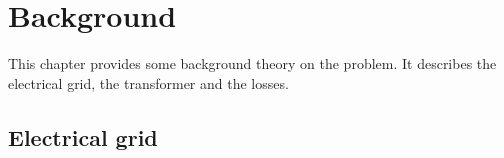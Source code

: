 \chapter{Background} \label{sec:background}

This chapter provides some background theory on the problem. It describes the electrical grid, the transformer and the losses.

\section{Electrical grid}
